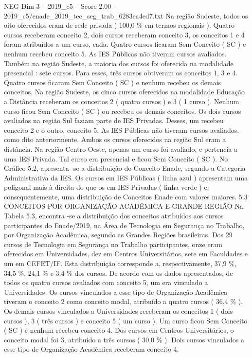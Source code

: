 \begin{textsample}{NEG Dim 3 – 2019\_c5 – Score 2.00 – 2019\_c5/enade\_2019\_tec\_seg\_trab\_6283ea4ed7.txt}
Na região Sudeste, todos os oito oferecidos eram de rede privada ( 100,0 \% em termos regionais ).
Quatro cursos receberam conceito 2, dois cursos receberam conceito 3, os conceitos 1 e 4 foram atribuídos a um curso, cada.
Quatro cursos ficaram Sem Conceito ( SC ) e nenhum recebeu conceito 5.
As IES Públicas não tiveram cursos avaliados.
Também na região Sudeste, a maioria dos cursos foi oferecida na modalidade presencial : sete cursos.
Para esses, três cursos obtiveram os conceitos 1, 3 e 4.
Quatro cursos ficaram Sem Conceito ( SC ) e nenhum recebeu os demais conceitos.
Na região Sudeste, os cinco cursos oferecidos na modalidade Educação a Distância receberam os conceitos 2 ( quatro cursos ) e 3 ( 1 curso ).
Nenhum curso ficou Sem Conceito ( SC ) ou recebeu os demais conceitos.
Os dois cursos avaliados na região Sul faziam parte de IES Privadas.
Desses, um recebeu conceito 2 e o outro, conceito 5.
As IES Públicas não tiveram cursos avaliados, como dito anteriormente.
Ambos os cursos oferecidos na região Sul eram a distância.
Na região Centro-Oeste, apenas um curso foi avaliado, e pertencia a uma IES Privada.
Tal curso era presencial e ficou Sem Conceito ( SC ).
No Gráfico 5.2, apresenta -se a distribuição do Conceito Enade, segundo a Categoria Administrativa da IES.
Os cursos em IES Públicas ( linha azul ) apresentam uma poligonal mais à direita do que os em IES Privadas ( linha verde ) e, consequentemente, uma distribuição de Conceitos Enade com valores maiores. 5.3 CONCEITOS POR ORGANIZAÇÃO ACADÊMICA E GRANDE REGIÃO Na Tabela 5.3, encontra -se a distribuição dos conceitos atribuídos aos cursos participantes do Enade/2019, na Área de Tecnologia em Segurança no Trabalho, por Organização Acadêmica, segundo as Grandes Regiões brasileiras.
Dos 29 cursos de Tecnologia em Segurança no Trabalho participantes, onze eram oferecidos em Universidades, dez em Centros Universitários, sete em Faculdades e um em CEFET/IF.
Esta distribuição corresponde a, respectivamente, 37,9 \%, 34,5 \%, 24,1 \% e 3,4 \% dos cursos.
De acordo com os dados apresentados, de todos os quatro cursos avaliados com conceito 5, um era vinculado a Universidades.
Os cursos vinculados a esse tipo de Organização Acadêmica tiveram o conceito 2 como conceito modal, atribuído a quatro cursos ( 36,4 \% ).
Os demais cursos vinculados a Universidades receberam os conceitos 1 ( dois cursos ), 3 ( três cursos ) e conceito 5 ( um curso ).
Um curso ficou Sem Conceito ( SC ) e nenhum recebeu conceito 4.
Dos cursos em Centros Universitários, o conceito modal foi 3, atribuído a três cursos ( 30,0 \% ).
Dois cursos vinculados a esse tipo de Organização Acadêmica receberam conceito 4.

\end{textsample}
